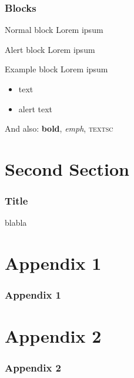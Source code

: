 \documentclass[t,10pt,aspectratio=169]{beamer}
\begin{document}
\begin{frame}
   \frametitle{Blocks}

   \begin{block}{Normal block}
      Lorem ipsum
   \end{block}

   \begin{alertblock}{Alert block}
      Lorem ipsum
   \end{alertblock}

   \begin{exampleblock}{Example block}
      Lorem ipsum
   \end{exampleblock}

   \begin{itemize}
      \item {} text
      \item \alert{alert} text
   \end{itemize}

   And also: \textbf{bold}, \emph{emph}, \textsc{textsc}

\end{frame}

\section{Second Section}

\begin{frame}
   \frametitle{Title}

   blabla
\end{frame}

\appendix

\begin{frame}[plain]
\end{frame}


\section{Appendix 1}

\begin{frame}
   \frametitle{Appendix 1}
\end{frame}

\section{Appendix 2}

\begin{frame}
   \frametitle{Appendix 2}
\end{frame}
\end{document}
